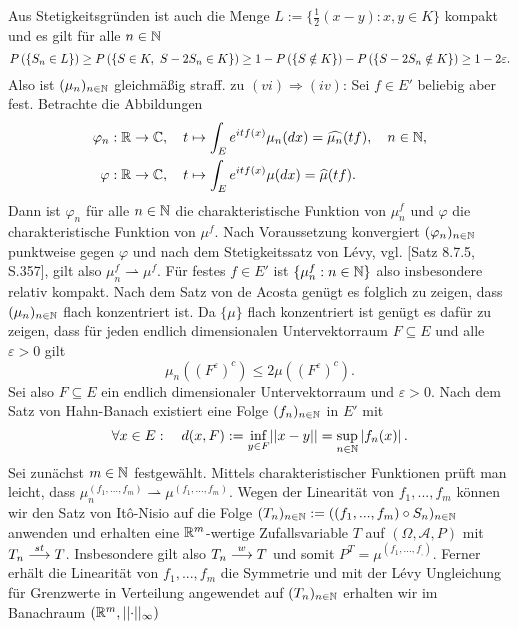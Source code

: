 \begin{proof*}
    Aus Stetigkeitsgründen ist auch die Menge $L := \{\frac{1}{2}(x-y): x,y \in K\}$ kompakt und es gilt für alle $n \in \mathbb{N}$
    $$
        \prob{S_n \in L} \geq \prob{S \in K, \ S-2S_n \in K} \geq 1 - \prob{S \notin K} - \prob{S-2S_n \notin K} \geq 1 - 2\varepsilon. 
    $$ 
    Also ist $(\mu_n)_{n \in \mathbb{N}}$ gleichmäßig straff. 
    \newline
    zu $(vi) \Rightarrow (iv)$: 
    Sei $f \in E'$ beliebig aber fest. Betrachte die Abbildungen 
    \begin{align*}
        \varphi_n &: \mathbb{R} \to \mathbb{C}, \quad t \mapsto \int_E e^{itf(x)}\mu_n(dx) = \widehat{\mu_n}(tf), \quad n \in \mathbb{N}, \\\
        \varphi   &: \mathbb{R} \to \mathbb{C}, \quad t \mapsto \int_E e^{itf(x)}\mu(dx) = \widehat{\mu}(tf). 
    \end{align*}
    Dann ist $\varphi_n$ für alle $n \in \mathbb{N}$ die charakteristische Funktion von $\mu_n^{f}$ und $\varphi$ die charakteristische Funktion von $\mu^f$. Nach Voraussetzung konvergiert $(\varphi_n)_{n \in \mathbb{N}}$ punktweise gegen $\varphi$ und nach 
    dem Stetigkeitssatz von Lévy, vgl. \cite{gs}[Satz 8.7.5, S.357], gilt also $\mu_n^f \rightharpoonup \mu^f$. Für festes $f \in E'$ ist $\{\mu_n^f : n \in \mathbb{N}\}$ also insbesondere relativ kompakt. Nach dem Satz von de Acosta genügt es folglich zu zeigen, dass $(\mu_n)_{n \in \mathbb{N}}$ flach konzentriert ist. 
    Da $\{\mu\}$ flach konzentriert ist genügt es dafür zu zeigen, dass für jeden endlich dimensionalen Untervektorraum $F \subseteq E$ und alle $\varepsilon > 0$ gilt 
    $$
        \mu_n((F^{\varepsilon})^c) \leq 2 \mu((F^{\varepsilon})^c).
    $$
    Sei also $F \subseteq E$ ein endlich dimensionaler Untervektorraum und $\varepsilon >0$. Nach dem Satz von Hahn-Banach existiert eine Folge $(f_n)_{n \in \mathbb{N}}$ in $E'$ mit 
    $$
        \forall x \in E: \quad d(x,F) := \inf_{y \in F}\lvert\lvert x-y \rvert\rvert = \sup_{n \in \mathbb{N}}\left| f_n(x) \right|. 
    $$
    Sei zunächst $m \in \mathbb{N}$ festgewählt. Mittels charakteristischer Funktionen prüft man leicht, dass $\mu_n^{(f_1,...,f_m)} \rightharpoonup \mu^{(f_1,...,f_m)}$. 
    Wegen der Linearität von $f_1,...,f_m$ können wir den Satz von Itô-Nisio auf die Folge $(T_n)_{n \in \mathbb{N}} := ((f_1,...,f_m)\circ S_n)_{n \in \mathbb{N}}$ anwenden und erhalten eine $\mathbb{R}^m$-wertige Zufallsvariable $T$ auf $(\Omega, \mathcal{A}, P)$ mit 
    $T_n \overset{st}{\longrightarrow} T$. Insbesondere gilt also $T_n \overset{w}{\longrightarrow} T$ und somit $P^T = \mu^{(f_1,...,f_,)}$. 
    Ferner erhält die Linearität von $f_1,...,f_m$ die Symmetrie und mit der Lévy Ungleichung für Grenzwerte in Verteilung angewendet auf $(T_n)_{n \in \mathbb{N}}$ erhalten wir im Banachraum $(\mathbb{R}^m, \lvert\lvert \cdot \rvert\rvert_{\infty})$

\end{proof*}
